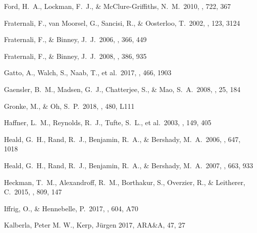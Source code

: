 \documentclass[twocolumn]{aastex62}
\begin{document}
\begin{thebibliography}{999}

 Ford, H.~A., Lockman, F.~J., \& McClure-Griffiths, N.~M.\ 2010, \apj, 722, 367 

 Fraternali, F., van Moorsel, G., Sancisi, R., \& Oosterloo, T.\ 2002, \aj, 123, 3124 

 Fraternali, F., \& Binney, J.~J.\ 2006, \mnras, 366, 449 

 Fraternali, F., \& Binney, J.~J.\ 2008, \mnras, 386, 935 

 Gatto, A., Walch, S., Naab, T., et al.\ 2017, \mnras, 466, 1903 

 Gaensler, B.~M., Madsen, G.~J., Chatterjee, S., \& Mao, S.~A.\ 2008, \pasa, 25, 184 

 Gronke, M., \& Oh, S.~P.\ 2018, \mnras, 480, L111 

 Haffner, L.~M., Reynolds, R.~J., Tufte, S.~L., et al.\ 2003, \apjs, 149, 405 

 Heald, G.~H., Rand, R.~J., Benjamin, R.~A., \& Bershady, M.~A.\ 2006, \apj, 647, 1018 

 Heald, G.~H., Rand, R.~J., Benjamin, R.~A., \& Bershady, M.~A.\ 2007, \apj, 663, 933 

 Heckman, T.~M., Alexandroff, R.~M., Borthakur, S., Overzier, R., \& Leitherer, C.\ 2015, \apj, 809, 147 


 Iffrig, O., \& Hennebelle, P.\ 2017, \aap, 604, A70 

 Kalberla, Peter M. W., Kerp, Jürgen 2017, ARA\&A, 47, 27 



\end{thebibliography}
\end{document}
